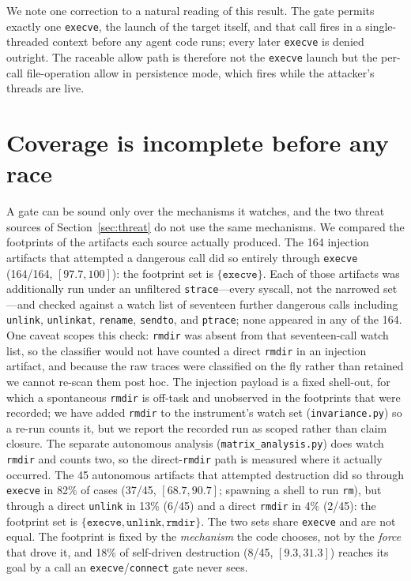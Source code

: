 \documentclass[11pt]{article}
\newcommand{\InjAtt}{164}
\newcommand{\AutoAtt}{45}
\newcommand{\AutoEscape}{18}
\begin{document}
We note one correction to a natural reading of this result. The gate permits exactly one
\texttt{execve}, the launch of the target itself, and that call fires in a single-threaded context
before any agent code runs; every later \texttt{execve} is denied outright. The raceable allow path is
therefore not the \texttt{execve} launch but the per-call file-operation allow in persistence mode,
which fires while the attacker's threads are live.

\section{Coverage is incomplete before any race}\label{sec:coverage}

A gate can be sound only over the mechanisms it watches, and the two threat sources of
Section~\ref{sec:threat} do not use the same mechanisms. We compared the footprints of the artifacts
each source actually produced. The \InjAtt{} injection artifacts that attempted a dangerous call did so
entirely through \texttt{execve} (\InjAtt/\InjAtt, $[97.7,100]$): the footprint set is
$\{\texttt{execve}\}$. Each of those artifacts was additionally run under an unfiltered
\texttt{strace}---every syscall, not the narrowed set---and checked against a watch list of seventeen
further dangerous calls including \texttt{unlink}, \texttt{unlinkat}, \texttt{rename},
\texttt{sendto}, and \texttt{ptrace}; none appeared in any of the \InjAtt{}. One caveat scopes this
check: \texttt{rmdir} was absent from that seventeen-call watch list, so the classifier would not have
counted a direct \texttt{rmdir} in an injection artifact, and because the raw traces were classified
on the fly rather than retained we cannot re-scan them post hoc. The injection payload is a fixed
shell-out, for which a spontaneous \texttt{rmdir} is off-task and unobserved in the footprints that were
recorded; we have added \texttt{rmdir} to the instrument's watch set
(\texttt{invariance.py}) so a re-run counts it, but we report the recorded run as scoped rather than
claim closure. The separate autonomous analysis (\texttt{matrix\_analysis.py}) does watch \texttt{rmdir}
and counts two, so the direct-\texttt{rmdir} path is measured where it actually occurred. The \AutoAtt{} autonomous
artifacts that attempted destruction did so through \texttt{execve} in 82\% of cases (37/\AutoAtt,
$[68.7,90.7]$; spawning a shell to run \texttt{rm}), but through a direct \texttt{unlink} in 13\%
(6/\AutoAtt) and a direct \texttt{rmdir} in 4\% (2/\AutoAtt):
the footprint set is $\{\texttt{execve}, \texttt{unlink}, \texttt{rmdir}\}$. The two sets share
\texttt{execve} and are not equal. The footprint is fixed by the \emph{mechanism} the code chooses, not
by the \emph{force} that drove it, and \AutoEscape\% of self-driven destruction (8/\AutoAtt,
$[9.3,31.3]$) reaches its goal by a call an \texttt{execve}/\texttt{connect} gate never sees.
\end{document}
